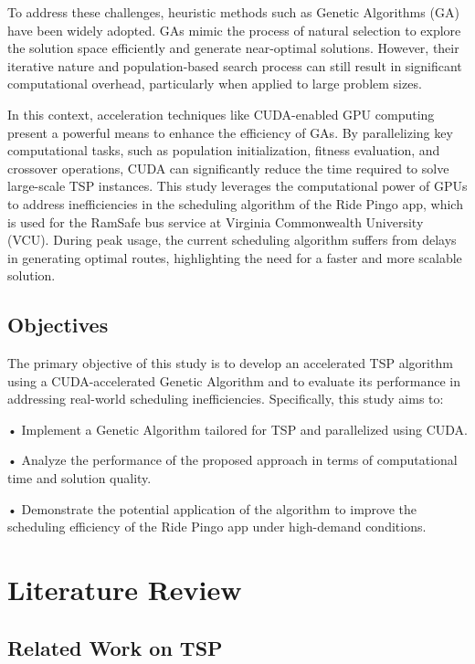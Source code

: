 \documentclass[conference]{IEEEtran}
\begin{document}
To address these challenges, heuristic methods such as Genetic Algorithms (GA) have been widely adopted. GAs mimic the process of natural selection to explore the solution space efficiently and generate near-optimal solutions. However, their iterative nature and population-based search process can still result in significant computational overhead, particularly when applied to large problem sizes.

In this context, acceleration techniques like CUDA-enabled GPU computing present a powerful means to enhance the efficiency of GAs. By parallelizing key computational tasks, such as population initialization, fitness evaluation, and crossover operations, CUDA can significantly reduce the time required to solve large-scale TSP instances. This study leverages the computational power of GPUs to address inefficiencies in the scheduling algorithm of the Ride Pingo app, which is used for the RamSafe bus service at Virginia Commonwealth University (VCU). During peak usage, the current scheduling algorithm suffers from delays in generating optimal routes, highlighting the need for a faster and more scalable solution.\\

\subsection{Objectives}

The primary objective of this study is to develop an accelerated TSP algorithm using a CUDA-accelerated Genetic Algorithm and to evaluate its performance in addressing real-world scheduling inefficiencies. Specifically, this study aims to:

• Implement a Genetic Algorithm tailored for TSP and parallelized using CUDA.

• Analyze the performance of the proposed approach in terms of computational time and solution quality.

• Demonstrate the potential application of the algorithm to improve the scheduling efficiency of the Ride Pingo app under high-demand conditions.


\section{Literature Review}

\subsection{Related Work on TSP}
\end{document}
